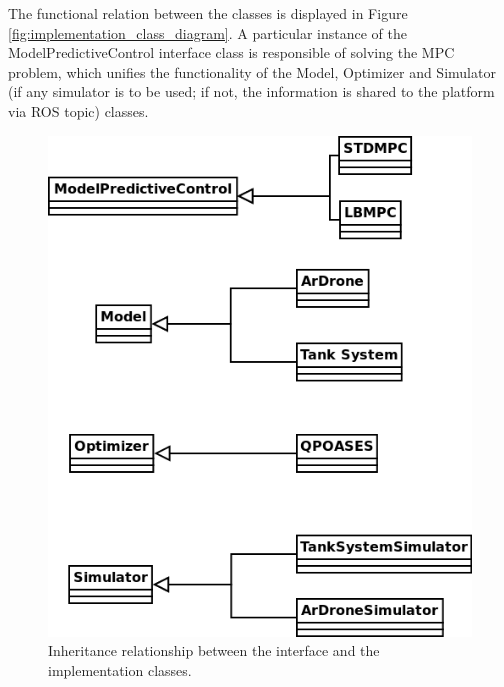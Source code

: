 The functional relation between the classes is displayed in Figure \ref{fig:implementation_class_diagram}. A particular instance of the ModelPredictiveControl interface class is responsible of solving the MPC problem, which unifies the functionality of the Model, Optimizer and Simulator (if any simulator is to be used; if not, the information is shared to the platform via ROS topic) classes.

\begin{figure}[h!]
\centering
\includegraphics[scale=0.5]{Images/Chapter4/Class_Diagram.png}
\caption{Inheritance relationship between the interface and the implementation classes.}
\label{fig:inheritance_class_diagram}
\end{figure}

